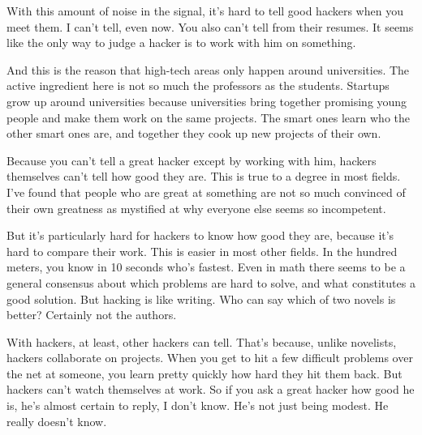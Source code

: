 With
                    this amount of noise in the signal, it's hard to tell good
                    hackers when you meet them. I can't tell, even now. You also
                    can't tell from their resumes. It seems like the only way to
                    judge a hacker is to work with him on something.

And
                    this is the reason that high-tech areas only happen around
                    universities. The active ingredient here is not so much the
                    professors as the students. Startups grow up around
                    universities because universities bring together promising
                    young people and make them work on the same projects. The
                    smart ones learn who the other smart ones are, and together
                    they cook up new projects of their own.

Because
                    you can't tell a great hacker except by working with him,
                    hackers themselves can't tell how good they are. This is
                    true to a degree in most fields. I've found that people who
                    are great at something are not so much convinced of their
                    own greatness as mystified at why everyone else seems so
                    incompetent.
                    

But it's
                    particularly hard for hackers to know how good they are,
                    because it's hard to compare their work. This is easier in
                    most other fields. In the hundred meters, you know in 10
                    seconds who's fastest. Even in math there seems to be a
                    general consensus about which problems are hard to solve,
                    and what constitutes a good solution. But hacking is like
                    writing. Who can say which of two novels is better?
                    Certainly not the authors.

With hackers, at
                    least, other hackers can tell. That's because, unlike
                    novelists, hackers collaborate on projects. When you get to
                    hit a few difficult problems over the net at someone, you
                    learn pretty quickly how hard they hit them back. But
                    hackers can't watch themselves at work. So if you ask a
                    great hacker how good he is, he's almost certain to reply, I
                    don't know. He's not just being modest. He really doesn't
                    know.

